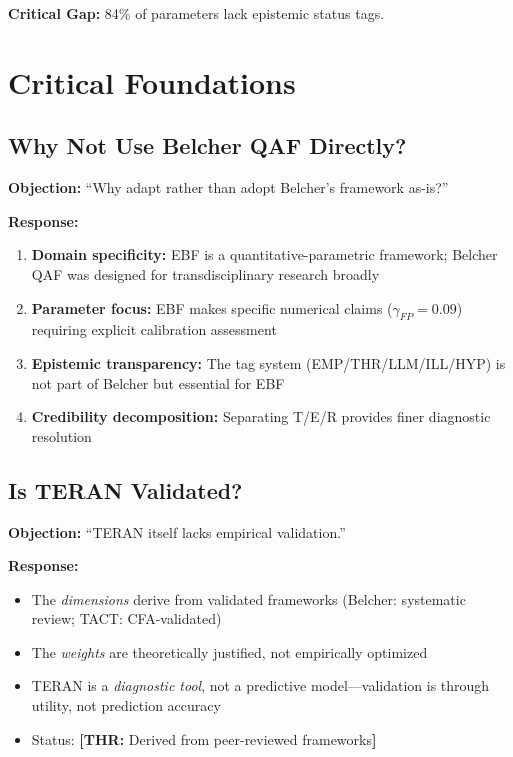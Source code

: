 \documentclass[11pt,a4paper]{article}
\newcommand{\tagTHR}[1]{\textcolor{thrblue}{\textbf{[THR:} #1\textbf{]}}}
\begin{document}
\textbf{Critical Gap:} 84\% of parameters lack epistemic status tags.


\section{Critical Foundations}

\subsection{Why Not Use Belcher QAF Directly?}

\textbf{Objection:} ``Why adapt rather than adopt Belcher's framework as-is?''

\textbf{Response:}
\begin{enumerate}
    \item \textbf{Domain specificity:} EBF is a quantitative-parametric framework; Belcher QAF was designed for transdisciplinary research broadly
    \item \textbf{Parameter focus:} EBF makes specific numerical claims ($\gamma_{FP} = 0.09$) requiring explicit calibration assessment
    \item \textbf{Epistemic transparency:} The tag system (EMP/THR/LLM/ILL/HYP) is not part of Belcher but essential for EBF
    \item \textbf{Credibility decomposition:} Separating T/E/R provides finer diagnostic resolution
\end{enumerate}

\subsection{Is TERAN Validated?}

\textbf{Objection:} ``TERAN itself lacks empirical validation.''

\textbf{Response:}
\begin{itemize}
    \item The \emph{dimensions} derive from validated frameworks (Belcher: systematic review; TACT: CFA-validated)
    \item The \emph{weights} are theoretically justified, not empirically optimized
    \item TERAN is a \emph{diagnostic tool}, not a predictive model—validation is through utility, not prediction accuracy
    \item Status: \tagTHR{Derived from peer-reviewed frameworks}
\end{itemize}
\end{document}
